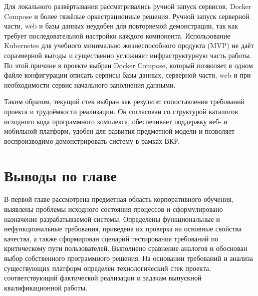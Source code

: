 Для локального развёртывания рассматривались ручной запуск сервисов, Docker Compose и более тяжёлые оркестрационные решения. Ручной запуск серверной части, web и базы данных неудобен для повторяемой демонстрации, так как требует последовательной настройки каждого компонента. Использование Kubernetes для учебного минимально жизнеспособного продукта (MVP) не даёт соразмерной выгоды и существенно усложняет инфраструктурную часть работы. По этой причине в проекте выбран Docker Compose, который позволяет в одном файле конфигурации описать сервисы базы данных, серверной части, web и при необходимости сервис начального заполнения данными\cite{docker_compose_docs}.

Таким образом, текущий стек выбран как результат сопоставления требований проекта и трудоёмкости реализации. Он согласован со структурой каталогов исходного кода программного комплекса, обеспечивает поддержку веб- и мобильной платформ, удобен для развития предметной модели и позволяет воспроизводимо демонстрировать систему в рамках ВКР.

\section{Выводы по главе}

В первой главе рассмотрена предметная область корпоративного обучения, выявлены проблемы исходного состояния процессов и сформулировано назначение разрабатываемой системы. Определены функциональные и нефункциональные требования, приведена их проверка на основные свойства качества, а также сформирован сценарий тестирования требований по критическому пути пользователей. Выполнено сравнение аналогов и обоснован выбор собственного программного решения. На основании требований и анализа существующих платформ определён технологический стек проекта, соответствующий фактической реализации и задачам выпускной квалификационной работы.
